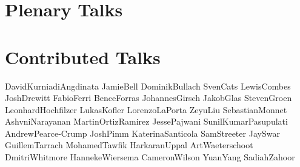 \documentclass{ConferenceBooklet}
\theoremstyle{definition}
\begin{document}
\newpage
\phantom{}

\begin{scheduleday}{2}{5cm}
\end{scheduleday}
\newpage


\section*{Plenary Talks}
\vspace{20pt}
\vspace{20pt}
\newpage

\section*{Contributed Talks}
              {DavidKurniadiAngdinata}
              {JamieBell}
              {DominikBullach}
              {SvenCats}
\newpage
{}
              {LewisCombes}
              {JoshDrewitt}
              {FabioFerri}
              {BenceForras}
\newpage
{}
              {JohannesGirsch}
              {JakobGlas}
              {StevenGroen}
              {LeonhardHochfilzer}
              {LukasKofler}
\newpage
{}
              {LorenzoLaPorta}
              {ZeyuLiu}
              {SebastianMonnet}
              {AshvniNarayanan}
              {MartinOrtizRamirez}
\newpage
{}
              {JessePajwani}
              {SunilKumarPasupulati}
              {AndrewPearce-Crump}
              {JoshPimm}
\newpage
{}
              {KaterinaSanticola}
              {SamStreeter}
              {JaySwar}
              {GuillemTarrach}
              {MohamedTawfik}
\newpage
{}
              {HarkaranUppal}
              {ArtWaeterschoot}
              {DmitriWhitmore}
              {HannekeWiersema}
              {CameronWilson}
\newpage
{}
              {YuanYang}
              {SadiahZahoor}
\end{document}
